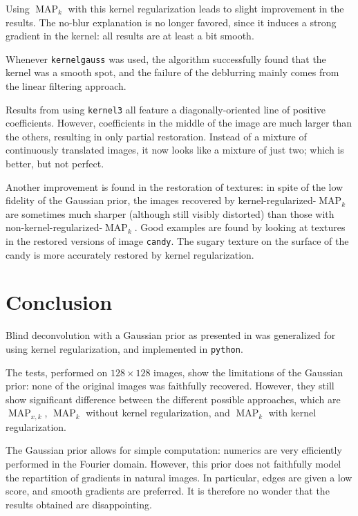\documentclass[english,a4paper]{article}
\theoremstyle{plain}
\theoremstyle{definition}
\theoremstyle{remark}
\DeclareMathOperator{\MAP}{MAP}
\begin{document}
\begin{itemize}
	Using $\MAP_k$ with this kernel regularization leads to slight improvement in the results. The no-blur explanation is no longer favored, since it induces a strong gradient in the kernel: all results are at least a bit smooth.
	
	Whenever \texttt{kernelgauss} was used, the algorithm successfully found that the kernel was a smooth spot, and the failure of the deblurring mainly comes from the linear filtering approach.
	
	Results from using \texttt{kernel3} all feature a diagonally-oriented line of positive coefficients. However, coefficients in the middle of the image are much larger than the others, resulting in only partial restoration. Instead of a mixture of continuously translated images, it now looks like a mixture of just two; which is better, but not perfect.
	
	Another improvement is found in the restoration of textures: in spite of the low fidelity of the Gaussian prior, the images recovered by kernel-regularized-$\MAP_k$ are sometimes much sharper (although still visibly distorted) than those with non-kernel-regularized-$\MAP_k$.
	Good examples are found by looking at textures in the restored versions of image \texttt{candy}. The sugary texture on the surface of the candy is more accurately restored by kernel regularization.
	
	
\end{itemize}


\section{Conclusion}

Blind deconvolution with a Gaussian prior as presented in \cite{levin2009understanding,levin2011efficient} was generalized for using kernel regularization, and implemented in \texttt{python}.

The tests, performed on $128\times 128$ images, show the limitations of the Gaussian prior: none of the original images was faithfully recovered.
However, they still show significant difference between the different possible approaches, which are $\MAP_{x,k}$, $\MAP_k$ without kernel regularization, and $\MAP_k$ with kernel regularization.

The Gaussian prior allows for simple computation: numerics are very efficiently performed in the Fourier domain. However, this prior does not faithfully model the repartition of gradients in natural images. In particular, edges are given a low score, and smooth gradients are preferred. It is therefore no wonder that the results obtained are disappointing.
\end{document}
